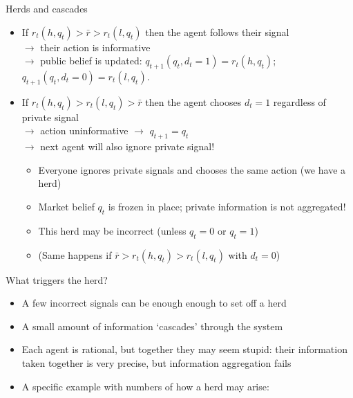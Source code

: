 \documentclass[english,10pt
,aspectratio=169
]{beamer}
\begin{document}
\begin{frame}{Herds and cascades}
	\begin{itemize}
		\item If $r_t(h,q_t) > \bar{r} > r_t(l,q_t)$ then the agent follows their signal 
		\\$\to$ their action is informative 
		\\$\to$ public belief is updated: $q_{t+1}(q_t,d_t=1) = r_t(h,q_t)$; $q_{t+1}(q_t,d_t=0) = r_t(l,q_t)$.
		
		\item If $r_t(h,q_t) > r_t(l,q_t) > \bar{r}$ then the agent chooses $d_t=1$ regardless of private signal 
		\\$\to$ action uninformative $\to$ $q_{t+1} = q_t$ 
		\\$\to$ next agent will also ignore private signal!
		\begin{itemize}
			\item Everyone ignores private signals and chooses the same action (we have a \alert{herd})
			\item Market belief $q_t$ is frozen in place; private information is not aggregated!
			\item This \alert{herd may be incorrect} (unless $q_t=0$ or $q_t=1$)
			\item (Same happens if $\bar{r} > r_t(h,q_t) > r_t(l,q_t)$ with $d_t=0$)
		\end{itemize}
	\end{itemize}
\end{frame}


\begin{frame}{What triggers the herd?} \label{HERD}
	\begin{itemize}
		\item A few incorrect signals can be enough enough to set off a herd
		\item A small amount of information `cascades' through the system
		\item Each agent is rational, but together they may seem stupid: their information taken together is very precise, but information aggregation fails
		\item A specific example with numbers of how a herd may arise: \hyperlink{EXP}{}
	\end{itemize}
\end{frame}
\end{document}
